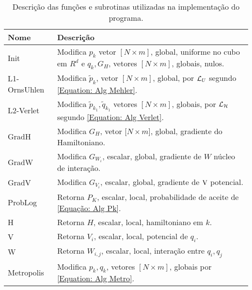\begin{table}[ht]
	\centering
	\begin{tabular}{ |p{2.6cm}||p{12cm}|  }
		\hline
		Nome & Descrição \\ 
		\hline
		\hline
		Init   		  	 & 
		Modifica ${p}_{k}$ vetor $[N\times m]$, global, uniforme no cubo em $R^d$ e ${q}_{k}, G_H$, vetores $[N\times m]$, globais, nulos. \\
		\hline
		L1-OrnsUhlen 	 & 
		Modifica $\tilde{p}_k$, vetor $[N\times m]$, global, por $\operatorname{\mathcal{L}}_U$ segundo \ref{Equation: Alg Mehler}. \\
		\hline
		L2-Verlet  	 	 & 
		Modifica $\tilde{p}_{k_1},\tilde{q}_{k_1}$ vetores $[N\times m]$, globais, por $\operatorname{\mathcal{L}}_{\operatorname{\mathcal{H}}}$ segundo \ref{Equation: Alg Verlet}.	\\
		\hline
		GradH         	 & 
		Modifica $G_H$, vetor $[N\times m$], global, gradiente do Hamiltoniano.					\\
		\hline
		GradW        	 &
		Modifica $G_{W_i}$, escalar, global, gradiente de $W$ núcleo de interação.	\\
		\hline
		GradV  	      	 &
		Modifica $G_{V_i}$, escalar, global, gradiente de $\operatorname{V}$ potencial.		                    \\
		\hline
		ProbLog       		 &
		Retorna $P_K$, escalar, local, probabilidade de aceite de \ref{Equação: Alg Pk}. \\
		\hline
		H              	 &
		Retorna $H$, escalar, local, hamiltoniano em $k$.	 							\\
		\hline
		V  	      			 &
		Retorna $V_i$, escalar, local, potencial de $q_i$.								\\
		\hline
		W         	  		 & 
		Retorna $W_{i,j}$, escalar, local, interação entre $q_i,q_j$ 							\\
		\hline
		Metropolis     	 & 
		Modifica ${p}_{k},{q}_{k}$, vetores $[N\times m]$, globais por \ref{Equation: Alg Metro}.								\\
		\hline
	\end{tabular}
	\caption{ Descrição das funções e subrotinas utilizadas na implementação do programa.}
	\label{Table: Funcoes e Subrotinas}
\end{table}

